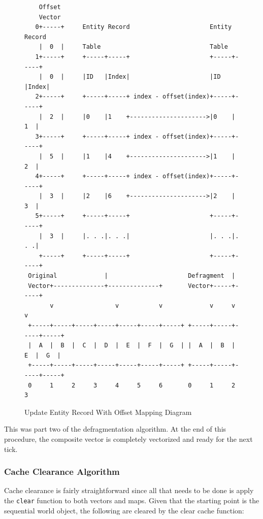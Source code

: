 \begin{figure}[H]
\begin{verbatim}
    Offset                                                                  
    Vector                                                                  
   0+-----+     Entity Record                      Entity Record            
    |  0  |     Table                              Table                    
   1+-----+     +-----+-----+                      +-----+-----+            
    |  0  |     |ID   |Index|                      |ID   |Index|            
   2+-----+     +-----+-----+ index - offset(index)+-----+-----+            
    |  2  |     |0    |1    +--------------------->|0    |  1  |            
   3+-----+     +-----+-----+ index - offset(index)+-----+-----+            
    |  5  |     |1    |4    +--------------------->|1    |  2  |            
   4+-----+     +-----+-----+ index - offset(index)+-----+-----+            
    |  3  |     |2    |6    +--------------------->|2    |  3  |            
   5+-----+     +-----+-----+                      +-----+-----+            
    |  3  |     |. . .|. . .|                      |. . .|. . .|            
    +-----+     +-----+-----+                      +-----+-----+            
 Original             |                      Defragment  |                  
 Vector+--------------+--------------+       Vector+-----+-----+            
       v                 v           v             v     v     v            
 +-----+-----+-----+-----+-----+-----+-----+ +-----+-----+-----+-----+      
 |  A  |  B  |  C  |  D  |  E  |  F  |  G  | |  A  |  B  |  E  |  G  |      
 +-----+-----+-----+-----+-----+-----+-----+ +-----+-----+-----+-----+      
 0     1     2     3     4     5     6       0     1     2     3            
\end{verbatim}
\caption{Update Entity Record With Offset Mapping Diagram}
\label{code:component_retrieval}
\end{figure}

This was part two of the defragmentation algorithm. At the end of this procedure, the composite vector is completely vectorized and ready for the next tick.

\subsubsection{Cache Clearance Algorithm}
Cache clearance is fairly straightforward since all that needs to be done is apply the \texttt{clear} function to both vectors and maps. Given that the starting point is the sequential world object, the following are cleared by the clear cache function:

